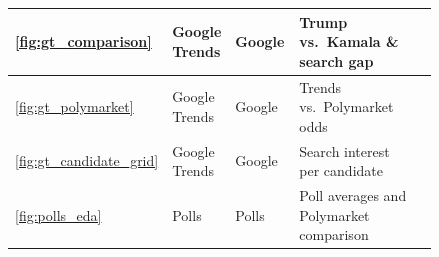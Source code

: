 \begin{longtable}{|p{0.05\linewidth}|p{0.14\linewidth}|p{0.16\linewidth}|p{0.43\linewidth}|p{0.06\linewidth}|}
\textcolor{textmuted}{\small\ref{fig:gt_comparison}}               & \textcolor{textmuted}{\small Google Trends}        & \textcolor{textmuted}{\small Google}          & \textcolor{textmuted}{\small Trump vs.\ Kamala \& search gap}          & \textcolor{textmuted}{\small\pageref{fig:gt_comparison}} \\\hline
\textcolor{textmuted}{\small\ref{fig:gt_polymarket}}               & \textcolor{textmuted}{\small Google Trends}        & \textcolor{textmuted}{\small Google}          & \textcolor{textmuted}{\small Trends vs.\ Polymarket odds}              & \textcolor{textmuted}{\small\pageref{fig:gt_polymarket}} \\\hline
\textcolor{textmuted}{\small\ref{fig:gt_candidate_grid}}           & \textcolor{textmuted}{\small Google Trends}        & \textcolor{textmuted}{\small Google}          & \textcolor{textmuted}{\small Search interest per candidate}            & \textcolor{textmuted}{\small\pageref{fig:gt_candidate_grid}} \\\hline
\textcolor{textmuted}{\small\ref{fig:polls_eda}}                   & \textcolor{textmuted}{\small Polls}                & \textcolor{textmuted}{\small Polls}           & \textcolor{textmuted}{\small Poll averages and Polymarket comparison}  & \textcolor{textmuted}{\small\pageref{fig:polls_eda}} \\\hline


\end{longtable}
